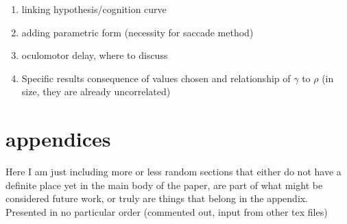 \documentclass{article}
\begin{document}
\begin{singlespace}
\begin{enumerate}
\item linking hypothesis/cognition curve
\item adding parametric form (necessity for saccade method)
\item oculomotor delay, where to discuss
\item Specific results consequence of values chosen and relationship of $\gamma$ to $\rho$ (in size, they are already uncorrelated)
\end{enumerate}
\end{singlespace}


\section{appendices}

Here  I am just including more or less random sections that either do not have a definite place yet in the main body of the paper, are part of what might be considered future work, or truly are things that belong in the appendix. Presented in no particular order (commented out, input from other tex files)


%

%


\end{document}
